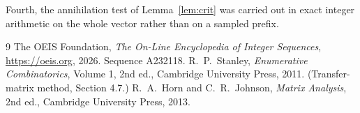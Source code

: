 \documentclass[11pt,a4paper]{article}
\theoremstyle{plain}
\theoremstyle{definition}
\begin{document}
Fourth, the annihilation test of Lemma~\ref{lem:crit} was carried out in exact integer
arithmetic on the whole vector rather than on a sampled prefix.

\begin{thebibliography}{9}
 The OEIS Foundation, \emph{The On-Line Encyclopedia of Integer
Sequences}, \url{https://oeis.org}, 2026. Sequence A232118.
 R.~P.~Stanley, \emph{Enumerative Combinatorics}, Volume 1, 2nd ed.,
Cambridge University Press, 2011. (Transfer-matrix method, Section 4.7.)
 R.~A.~Horn and C.~R.~Johnson, \emph{Matrix Analysis}, 2nd ed., Cambridge
University Press, 2013.
\end{thebibliography}
\end{document}
